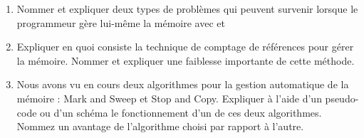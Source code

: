 \begin{Exercise}

\begin{enumerate}

\item Nommer et expliquer deux types de problèmes qui peuvent survenir
  lorsque le programmeur gère lui-même la mémoire avec
   et 

\item Expliquer en quoi consiste la technique de comptage de références pour
gérer la mémoire. Nommer et expliquer une faiblesse importante de
cette méthode.

\item Nous avons vu en cours deux algorithmes pour la gestion automatique de
la mémoire : Mark and Sweep et Stop and Copy. Expliquer à l'aide d'un
pseudo-code ou d'un schéma le fonctionnement d'un de ces deux
algorithmes. Nommez un avantage de l'algorithme choisi par rapport à
l'autre.

\end{enumerate}

\end{Exercise}

